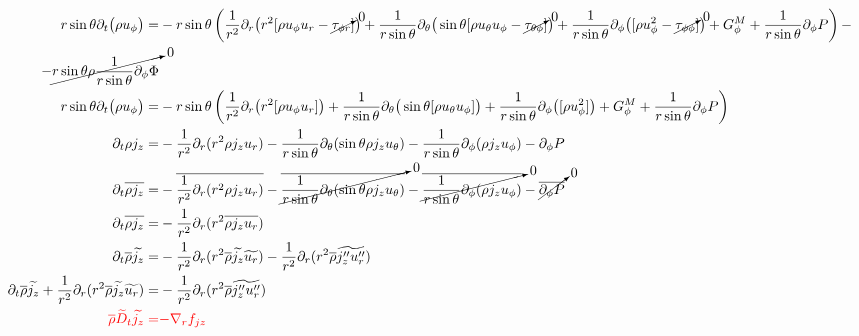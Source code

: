 \documentclass[10pt,paper=a4]{report}
\newcommand{\eht}{\overline}
\newcommand{\fht}{\widetilde}
\begin{document}
\begin{align}
r\sin{\theta} \partial_{t} \big(\rho u_{\phi}\big) = & -r\sin{\theta}\left( \frac{1}{r^{2}} \partial_{r} \big(r^{2} [\rho u_{\phi} u_r - \cancelto{0}{\tau_{\phi r}}]\big) + \frac{1}{r\sin{\theta}}\partial_{\theta}\big(\sin{\theta}[\rho u_{\theta}u_\phi - \cancelto{0}{\tau_{\theta \phi}}]\big) + \frac{1}{r\sin{\theta}}\partial_{\phi}\big([\rho u_{\phi}^2 - \cancelto{0}{\tau_{\phi \phi}}]\big) + G_\phi^M + \frac{1}{r\sin{\theta}} \partial_{\phi} P \right) - \nonumber \\
- \cancelto{0}{r\sin{\theta} \rho \frac{1}{r \sin{\theta}} \partial_{\phi} \Phi} \\
r\sin{\theta} \partial_{t} \big(\rho u_{\phi}\big) = & -r\sin{\theta}\left( \frac{1}{r^{2}} \partial_{r} \big(r^{2} [\rho u_{\phi} u_r]\big) + \frac{1}{r\sin{\theta}}\partial_{\theta}\big(\sin{\theta}[\rho u_{\theta}u_\phi]\big) + \frac{1}{r\sin{\theta}}\partial_{\phi}\big([\rho u_{\phi}^2]\big) + G_\phi^M + \frac{1}{r\sin{\theta}} \partial_{\phi} P \right) \\
\partial_t \rho j_z = & -\frac{1}{r^2}\partial_r (r^2 \rho j_z u_r) - \frac{1}{r\sin{\theta}}\partial_\theta (\sin{\theta}\rho j_z u_\theta) - \frac{1}{r\sin{\theta}}\partial_\phi (\rho j_z u_\phi) - \partial_\phi P \\
\partial_t \eht{\rho j_z} = & -\eht{\frac{1}{r^2}\partial_r (r^2 \rho j_z u_r)} - \cancelto{0}{\eht{\frac{1}{r\sin{\theta}}\partial_\theta (\sin{\theta}\rho j_z u_\theta)}} - \cancelto{0}{\eht{\frac{1}{r\sin{\theta}}\partial_\phi (\rho j_z u_\phi)}} - \cancelto{0}{\eht{\partial_\phi P}}\\
\partial_t \eht{\rho j_z} = & -\frac{1}{r^2}\partial_r (r^2 \eht{\rho j_z u_r})  \\
\partial_t \eht{\rho} \fht{j_z} = & -\frac{1}{r^2}\partial_r (r^2 \eht{\rho} \fht{j_z} \fht{u_r}) -\frac{1}{r^2}\partial_r (r^2 \eht{\rho} \fht{j''_z u''_r})  \\
\partial_t \eht{\rho} \fht{j_z} + \frac{1}{r^2}\partial_r (r^2 \eht{\rho} \fht{j_z} \fht{u_r}) = & -\frac{1}{r^2}\partial_r (r^2 \eht{\rho} \fht{j''_z u''_r})  \\
{\color{red} \eht{\rho}\fht{D}_t \fht{j_z} =} & {\color{red} -\nabla_r f_{jz}} 
\end{align}

\fontsize{12pt}{20pt}

\end{document}
